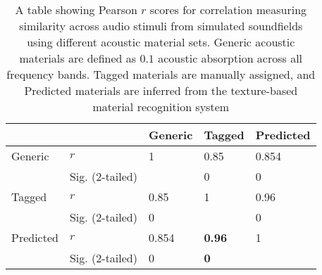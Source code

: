 \begin{table}[htbp]%
    \centering
    \caption[Texture-based material recognition correlation scores]{A table showing Pearson $r$ scores for correlation measuring similarity across audio stimuli from simulated soundfields using different acoustic material sets. Generic acoustic materials are defined as $0.1$ acoustic absorption across all frequency bands. Tagged materials are manually assigned, and Predicted materials are inferred from the texture-based material recognition system}%
    \begin{tabular}{lllll}%
    \toprule
              &                     & Generic & Tagged        & Predicted  \\ \midrule 
    Generic   & $r$                 & 1       & 0.85          & 0.854 \\
              & Sig. (2-tailed)     &         & 0             & 0     \\ 
    Tagged    & $r$                 & 0.85    & 1             & 0.96  \\
              & Sig. (2-tailed)     & 0       &               & 0     \\ 
    Predicted & $r$                 & 0.854   & \textbf{0.96} & 1     \\
              & Sig. (2-tailed)     & 0       & \textbf{0}    &       \\ \bottomrule
    \end{tabular}%
    \label{tab:chi-perceptual-distance}%
\end{table}%